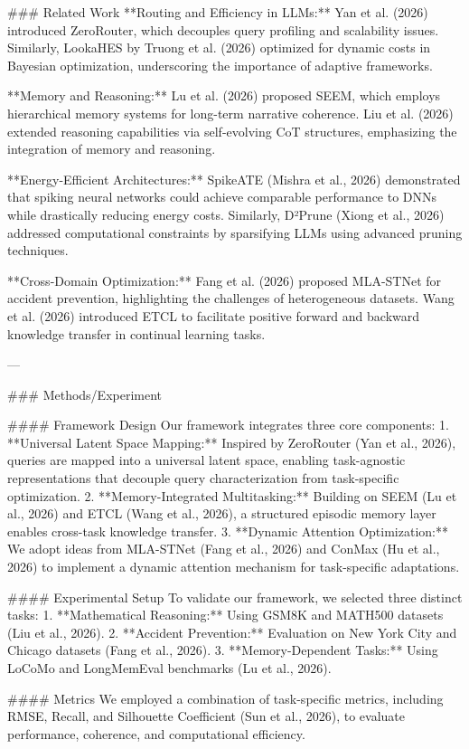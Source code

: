 ### Related Work  
**Routing and Efficiency in LLMs:** Yan et al. (2026) introduced ZeroRouter, which decouples query profiling and scalability issues. Similarly, LookaHES by Truong et al. (2026) optimized for dynamic costs in Bayesian optimization, underscoring the importance of adaptive frameworks.

**Memory and Reasoning:** Lu et al. (2026) proposed SEEM, which employs hierarchical memory systems for long-term narrative coherence. Liu et al. (2026) extended reasoning capabilities via self-evolving CoT structures, emphasizing the integration of memory and reasoning.

**Energy-Efficient Architectures:** SpikeATE (Mishra et al., 2026) demonstrated that spiking neural networks could achieve comparable performance to DNNs while drastically reducing energy costs. Similarly, D²Prune (Xiong et al., 2026) addressed computational constraints by sparsifying LLMs using advanced pruning techniques.

**Cross-Domain Optimization:** Fang et al. (2026) proposed MLA-STNet for accident prevention, highlighting the challenges of heterogeneous datasets. Wang et al. (2026) introduced ETCL to facilitate positive forward and backward knowledge transfer in continual learning tasks.

---

### Methods/Experiment  

#### Framework Design  
Our framework integrates three core components:  
1. **Universal Latent Space Mapping:** Inspired by ZeroRouter (Yan et al., 2026), queries are mapped into a universal latent space, enabling task-agnostic representations that decouple query characterization from task-specific optimization.  
2. **Memory-Integrated Multitasking:** Building on SEEM (Lu et al., 2026) and ETCL (Wang et al., 2026), a structured episodic memory layer enables cross-task knowledge transfer.  
3. **Dynamic Attention Optimization:** We adopt ideas from MLA-STNet (Fang et al., 2026) and ConMax (Hu et al., 2026) to implement a dynamic attention mechanism for task-specific adaptations.

#### Experimental Setup  
To validate our framework, we selected three distinct tasks:  
1. **Mathematical Reasoning:** Using GSM8K and MATH500 datasets (Liu et al., 2026).  
2. **Accident Prevention:** Evaluation on New York City and Chicago datasets (Fang et al., 2026).  
3. **Memory-Dependent Tasks:** Using LoCoMo and LongMemEval benchmarks (Lu et al., 2026).  

#### Metrics  
We employed a combination of task-specific metrics, including RMSE, Recall, and Silhouette Coefficient (Sun et al., 2026), to evaluate performance, coherence, and computational efficiency.

